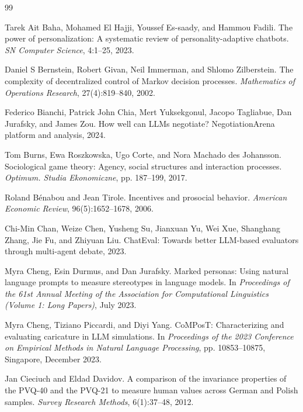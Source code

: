 \documentclass[11pt,a4paper]{article}
\begin{document}
\begin{thebibliography}{99}
\small

Tarek Ait Baha, Mohamed El Hajji, Youssef Es-saady, and Hammou Fadili. The power of personalization: A systematic review of personality-adaptive chatbots. \textit{SN Computer Science}, 4:1--25, 2023.

Daniel S Bernstein, Robert Givan, Neil Immerman, and Shlomo Zilberstein. The complexity of decentralized control of Markov decision processes. \textit{Mathematics of Operations Research}, 27(4):819--840, 2002.

Federico Bianchi, Patrick John Chia, Mert Yuksekgonul, Jacopo Tagliabue, Dan Jurafsky, and James Zou. How well can LLMs negotiate? NegotiationArena platform and analysis, 2024.

Tom Burns, Ewa Roszkowska, Ugo Corte, and Nora Machado des Johansson. Sociological game theory: Agency, social structures and interaction processes. \textit{Optimum. Studia Ekonomiczne}, pp. 187--199, 2017.

Roland Bénabou and Jean Tirole. Incentives and prosocial behavior. \textit{American Economic Review}, 96(5):1652--1678, 2006.

Chi-Min Chan, Weize Chen, Yusheng Su, Jianxuan Yu, Wei Xue, Shanghang Zhang, Jie Fu, and Zhiyuan Liu. ChatEval: Towards better LLM-based evaluators through multi-agent debate, 2023.

Myra Cheng, Esin Durmus, and Dan Jurafsky. Marked personas: Using natural language prompts to measure stereotypes in language models. In \textit{Proceedings of the 61st Annual Meeting of the Association for Computational Linguistics (Volume 1: Long Papers)}, July 2023.

Myra Cheng, Tiziano Piccardi, and Diyi Yang. CoMPosT: Characterizing and evaluating caricature in LLM simulations. In \textit{Proceedings of the 2023 Conference on Empirical Methods in Natural Language Processing}, pp. 10853--10875, Singapore, December 2023.

Jan Cieciuch and Eldad Davidov. A comparison of the invariance properties of the PVQ-40 and the PVQ-21 to measure human values across German and Polish samples. \textit{Survey Research Methods}, 6(1):37--48, 2012.


\end{thebibliography}
\end{document}
